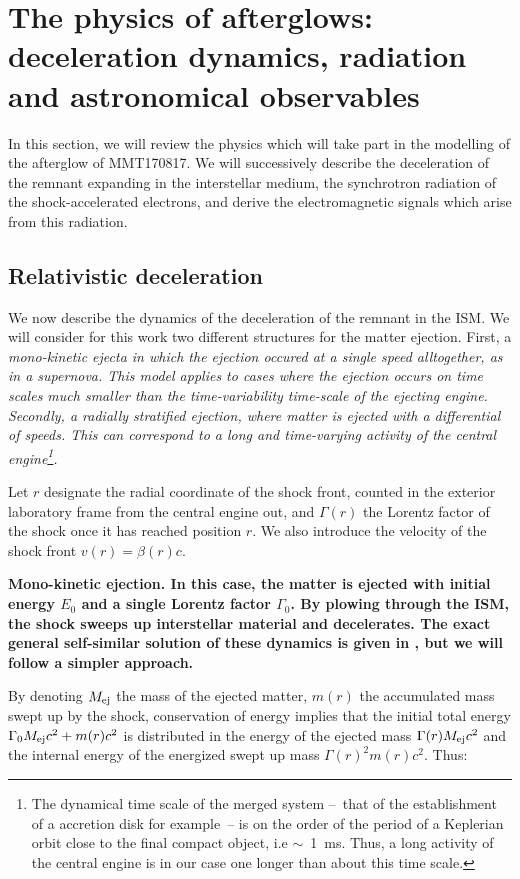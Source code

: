 \section{The physics of afterglows: deceleration dynamics, radiation and astronomical observables}

In this section, we will review the physics which will take part in the modelling of the afterglow of MMT170817. We will successively describe the deceleration of the remnant expanding in the interstellar medium, the synchrotron radiation of the shock-accelerated electrons, and derive the electromagnetic signals which arise from this radiation.

\subsection{Relativistic deceleration}
\label{dynamic}
We now describe the dynamics of the deceleration of the remnant in the ISM. We will consider for this work two different structures for the matter ejection. First, a \it{mono-kinetic ejecta} in which the ejection occured at a single speed alltogether, as in a supernova. This model applies to cases where the ejection occurs on time scales much smaller than the time-variability time-scale of the ejecting engine. Secondly, a \it{radially stratified ejection}, where matter is ejected with a differential of speeds. This can correspond to a long and time-varying activity of the central engine\footnote{The dynamical time scale of the merged system --~that of the establishment of a accretion disk for example~-- is on the order of the period of a Keplerian orbit close to the final compact object, i.e $\sim$~1~ms. Thus, a long activity of the central engine is in our case one longer than about this time scale.}.

Let $r$ designate the radial coordinate of the shock front, counted in the exterior laboratory frame from the central engine out, and $\Gamma(r)$ the Lorentz factor of the shock once it has reached position $r$. We also introduce the velocity of the shock front $v(r) = \beta(r)c$.

\bf{Mono-kinetic ejection.} In this case, the matter is ejected with initial energy $E_0$ and a single Lorentz factor $\Gamma_0$. By plowing through the ISM, the shock sweeps up interstellar material and decelerates. The exact general self-similar solution of these dynamics is given in \citep{59}, but we will follow a simpler approach.

By denoting $M_{\rm{ej}}$ the mass of the ejected matter, $m(r)$ the accumulated mass swept up by the shock, conservation of energy implies that the initial total energy $\Gamma_0 M_{\rm{ej}} c^2 + m(r) c^2$ is distributed in the energy of the ejected mass $\Gamma(r) M_{\rm{ej}} c^2$ and the internal energy of the energized swept up mass $\Gamma(r)^2 m(r) c^2$. Thus:

